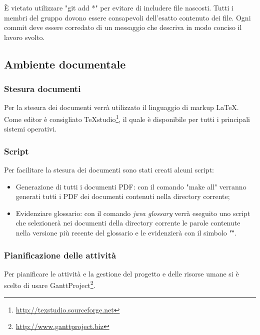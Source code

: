 È vietato utilizzare "git add *" per evitare di includere file nascosti. Tutti i membri del gruppo dovono essere consapevoli dell'esatto contenuto dei file. Ogni commit deve essere corredato di un messaggio che descriva in modo \gls{conciso} il lavoro svolto.

\newpage
\subsection{Ambiente documentale}

\subsubsection{Stesura documenti}

Per la stesura dei documenti verrà utilizzato il \gls{linguaggio di markup} \LaTeX.
Come editor è consigliato TeXstudio\footnote{\url{http://texstudio.sourceforge.net}}, il quale è disponibile per tutti i principali sistemi operativi.

\subsubsection{Script}

Per facilitare la stesura dei documenti sono stati creati alcuni script:

\begin{itemize}
	\item Generazione di tutti i documenti PDF: con il comando "make all" verranno generati tutti i PDF dei documenti contenuti nella directory corrente;
	\item Evidenziare glossario: con il comando \textit{java glossary} verrà eseguito uno script che selezionerà nei documenti della directory corrente le parole contenute nella versione più recente del glossario e le evidenzierà con il simbolo "\G".

\end{itemize}

\subsubsection{Pianificazione delle attività}
Per pianificare le attività e la gestione del progetto e delle risorse umane si è scelto di usare GanttProject\footnote{\url{http://www.ganttproject.biz}}.

